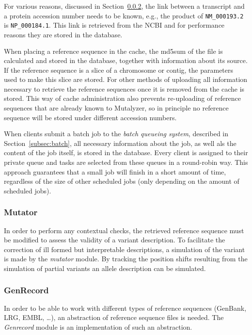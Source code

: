 \documentclass{article}
\begin{document}
For various reasons, discussed in Section~\ref{subsubsec:genrecord}, the link
between a transcript and a protein accession number needs to be known, e.g.,
the product of \texttt{NM\_000193.2} is \texttt{NP\_000184.1}. This link is
retrieved from the NCBI and for performance reasons they are stored in the
database.

When placing a reference sequence in the cache, the md5sum of the file is
calculated and stored in the database, together with information about its
source. If the reference sequence is a slice of a chromosome or contig, the
parameters used to make this slice are stored. For other methods of uploading
all information necessary to retrieve the reference sequences once it is
removed from the cache is stored. This way of cache administration also
prevents re-uploading of reference sequences that are already known to
Mutalyzer, so in principle no reference sequence will be stored under different
accession numbers.

When clients submit a batch job to the \emph{batch queueing system}, described
in Section~\ref{subsec:batch}, all necessary information about the job, as well
als the content of the job itself, is stored in the database. Every client is
assigned to their private queue and tasks are selected from these queues in a
round-robin way. This approach guarantees that a small job will finish in a
short amount of time, regardless of the size of other scheduled jobs (only
depending on the amount of scheduled jobs).

\subsubsection{Mutator}
In order to perform any contextual checks, the retrieved reference sequence
must be modified to assess the validity of a variant description. To facilitate
the correction of ill formed but interpretable descriptions, a simulation of
the variant is made by the \emph{mutator} module. By tracking the position
shifts resulting from the simulation of partial variants an allele description
can be simulated.

\subsubsection{GenRecord} \label{subsubsec:genrecord}
In order to be able to work with different types of reference sequences
(GenBank, LRG, EMBL, \ldots), an abstraction of reference sequence files is
needed. The \emph{Genrecord} module is an implementation of such an
abstraction.
\end{document}
